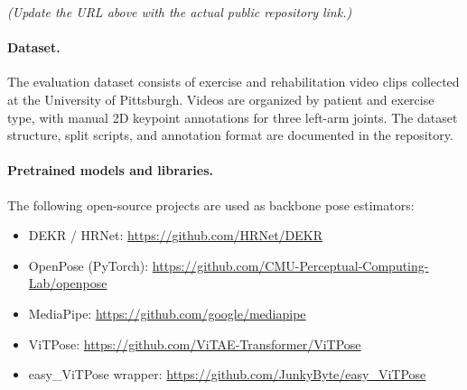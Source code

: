 \documentclass[11pt,a4paper]{article}
\begin{document}
\noindent\textit{(Update the URL above with the actual public repository link.)}

\paragraph{Dataset.}
The evaluation dataset consists of exercise and rehabilitation video clips
collected at the University of Pittsburgh.  Videos are organized by patient
and exercise type, with manual 2D keypoint annotations for three left-arm
joints.  The dataset structure, split scripts, and annotation format are
documented in the repository.


\paragraph{Pretrained models and libraries.}
The following open-source projects are used as backbone pose estimators:
\begin{itemize}[nosep]
    \item DEKR / HRNet: \url{https://github.com/HRNet/DEKR}~\cite{geng2021dekr}
    \item OpenPose (PyTorch): \url{https://github.com/CMU-Perceptual-Computing-Lab/openpose}~\cite{cao2017openpose}
    \item MediaPipe: \url{https://github.com/google/mediapipe}~\cite{lugaresi2019mediapipe}
    \item ViTPose: \url{https://github.com/ViTAE-Transformer/ViTPose}~\cite{xu2022vitpose}
    \item easy\_ViTPose wrapper: \url{https://github.com/JunkyByte/easy_ViTPose}
\end{itemize}



\end{document}
